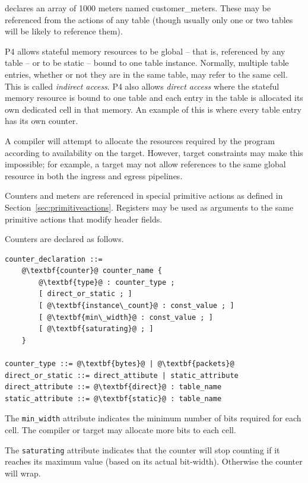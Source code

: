 \documentclass[12pt]{article}
\begin{document}
declares an array of 1000 meters named customer_meters. These may be referenced 
from the actions of any table (though usually only one or two tables will 
be likely to reference them).

P4 allows stateful memory resources to be global -- that is, referenced by 
any table -- or to be static -- bound to one table instance. Normally, multiple 
table entries, whether or not they are in the same table, may refer to the 
same cell. This is called \textit{indirect access}. P4 also allows \textit{direct access} where 
the stateful memory resource is bound to one table and each entry in the table 
is allocated its own dedicated cell in that memory. An example of this is 
where every table entry has its own counter.

A compiler will attempt to allocate the resources required by the program 
according to availability on the target. However, target constraints may make 
this impossible; for example, a target may not allow references to the same 
global resource in both the ingress and egress pipelines.

Counters and meters are referenced in special primitive actions as defined 
in Section~\ref{sec:primitiveactions}. Registers may be used as arguments to 
the same primitive actions that modify header fields.


Counters are declared as follows.

\begin{lstlisting}[frame=single,backgroundcolor=\color{bnfgreen},escapechar=\@]
counter_declaration ::= 
    @\textbf{counter}@ counter_name {
        @\textbf{type}@ : counter_type ;
        [ direct_or_static ; ]
        [ @\textbf{instance\_count}@ : const_value ; ]
        [ @\textbf{min\_width}@ : const_value ; ]
        [ @\textbf{saturating}@ ; ]
    }

counter_type ::= @\textbf{bytes}@ | @\textbf{packets}@
direct_or_static ::= direct_attibute | static_attribute
direct_attribute ::= @\textbf{direct}@ : table_name
static_attribute ::= @\textbf{static}@ : table_name
\end{lstlisting}


The \texttt{min_width} attribute indicates the minimum number of bits
required for each cell.  The compiler or target may allocate more bits
to each cell.

The \texttt{saturating} attribute indicates that the counter will stop
counting if it reaches its maximum value (based on its actual
bit-width). Otherwise the counter will wrap.
\end{document}
